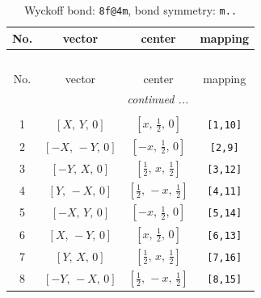 \documentclass[fleqn,8pt]{jsarticle}
\begin{document}
\begin{longtable}{cccc}
\caption{Wyckoff bond: {\tt 8f@4m}, bond symmetry: {\tt m..}}
 \\
 \hline \hline
No. & vector & center & mapping \\ \hline \endfirsthead

\multicolumn{3}{l}{\tablename\ \thetable{}} \\
 \hline \hline
No. & vector & center & mapping \\ \hline \endhead

 \hline \hline
\multicolumn{3}{r}{\footnotesize\it continued ...} \\ \endfoot

 \hline \hline
\multicolumn{3}{r}{} \\ \endlastfoot

1 & $\left[ X,\, Y,\, 0 \right]$ & $\left[ x,\, \frac{1}{2},\, 0 \right]$ & {\tt [1,10]} \\ \hline
2 & $\left[ - X,\, - Y,\, 0 \right]$ & $\left[ - x,\, \frac{1}{2},\, 0 \right]$ & {\tt [2,9]} \\ \hline
3 & $\left[ - Y,\, X,\, 0 \right]$ & $\left[ \frac{1}{2},\, x,\, \frac{1}{2} \right]$ & {\tt [3,12]} \\ \hline
4 & $\left[ Y,\, - X,\, 0 \right]$ & $\left[ \frac{1}{2},\, - x,\, \frac{1}{2} \right]$ & {\tt [4,11]} \\ \hline
5 & $\left[ - X,\, Y,\, 0 \right]$ & $\left[ - x,\, \frac{1}{2},\, 0 \right]$ & {\tt [5,14]} \\ \hline
6 & $\left[ X,\, - Y,\, 0 \right]$ & $\left[ x,\, \frac{1}{2},\, 0 \right]$ & {\tt [6,13]} \\ \hline
7 & $\left[ Y,\, X,\, 0 \right]$ & $\left[ \frac{1}{2},\, x,\, \frac{1}{2} \right]$ & {\tt [7,16]} \\ \hline
8 & $\left[ - Y,\, - X,\, 0 \right]$ & $\left[ \frac{1}{2},\, - x,\, \frac{1}{2} \right]$ & {\tt [8,15]} \\
\end{longtable}
\renewcommand{\arraystretch}{1.2}
\end{document}
